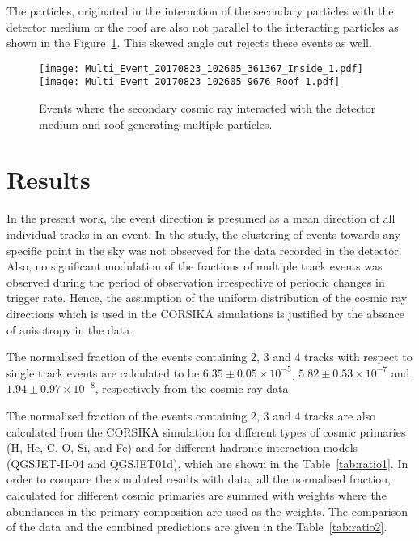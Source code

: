 The particles, originated in the interaction of the secondary particles
with the detector medium or the roof are also not parallel to the
interacting particles as shown in the Figure~\ref{fig:eventinside}.
This skewed angle cut rejects these events as well.
\begin{figure}[h]
  \texttt{[image: Multi\_Event\_20170823\_102605\_361367\_Inside\_1.pdf]}
  \texttt{[image: Multi\_Event\_20170823\_102605\_9676\_Roof\_1.pdf]}
  \caption{Events where the secondary cosmic ray interacted with
    the detector medium and roof generating multiple particles.}
  \label{fig:eventinside}
\end{figure}


\section{Results} \label{sec:result}
In the present work, the event direction is presumed
as a mean direction of all
individual tracks in an event. In the study, the clustering
of events towards any specific point in the sky was not observed
for the data recorded in the detector. Also, no significant
modulation of the fractions of multiple track events was observed
during the period of observation irrespective of periodic changes
in trigger rate. 
Hence, the assumption of the uniform distribution of the cosmic ray
directions which is used in the CORSIKA simulations is justified
by the absence of anisotropy in the data.

The normalised fraction of the events containing 2, 3 and 4 tracks
with respect to single track events are calculated to be
$6.35\pm 0.05\times 10^{-5}$, $5.82\pm 0.53\times 10^{-7}$ and
$1.94\pm 0.97\times 10^{-8}$, respectively from the cosmic ray data.

The normalised fraction of the events containing 2, 3 and 4 tracks
are also calculated from the CORSIKA simulation for different types
of cosmic primaries (H, He, C, O, Si, and Fe) and for different
hadronic interaction models (QGSJET-II-04 and QGSJET01d), which are
shown in the Table~\ref{tab:ratio1}. In order to compare the simulated
results with data, all the normalised fraction, calculated for
different cosmic primaries are summed with weights where the
abundances in the primary composition\cite{cosmic1,pdgspectra1} are
used as the weights. The
comparison of the data and the combined predictions are given in
the Table~\ref{tab:ratio2}.

